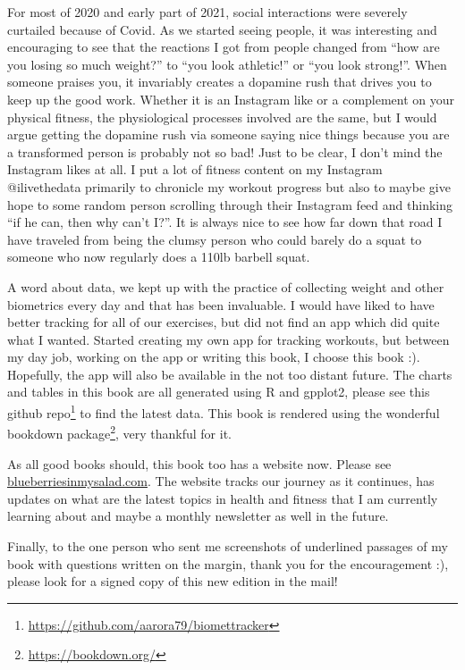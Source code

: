 \documentclass[
  oneside]{book}
\DeclareRobustCommand{\href}[2]{#2\footnote{\url{#1}}}
\begin{document}
For most of 2020 and early part of 2021, social interactions were severely curtailed because of Covid. As we started seeing people, it was interesting and encouraging to see that the reactions I got from people changed from ``how are you losing so much weight?'' to ``you look athletic!'' or ``you look strong!''. When someone praises you, it invariably creates a dopamine rush that drives you to keep up the good work. Whether it is an Instagram like or a complement on your physical fitness, the physiological processes involved are the same, but I would argue getting the dopamine rush via someone saying nice things because you are a transformed person is probably not so bad! Just to be clear, I don't mind the Instagram likes at all. I put a lot of fitness content on my Instagram @ilivethedata primarily to chronicle my workout progress but also to maybe give hope to some random person scrolling through their Instagram feed and thinking ``if he can, then why can't I?''. It is always nice to see how far down that road I have traveled from being the clumsy person who could barely do a squat to someone who now regularly does a 110lb barbell squat.

A word about data, we kept up with the practice of collecting weight and other biometrics every day and that has been invaluable. I would have liked to have better tracking for all of our exercises, but did not find an app which did quite what I wanted. Started creating my own app for tracking workouts, but between my day job, working on the app or writing this book, I choose this book :). Hopefully, the app will also be available in the not too distant future. The charts and tables in this book are all generated using R and gpplot2, please see this \href{https://github.com/aarora79/biomettracker}{github repo} to find the latest data. This book is rendered using the wonderful \href{https://bookdown.org/}{bookdown package}, very thankful for it.

As all good books should, this book too has a website now. Please see \url{blueberriesinmysalad.com}. The website tracks our journey as it continues, has updates on what are the latest topics in health and fitness that I am currently learning about and maybe a monthly newsletter as well in the future.

Finally, to the one person who sent me screenshots of underlined passages of my book with questions written on the margin, thank you for the encouragement :), please look for a signed copy of this new edition in the mail!
\end{document}

